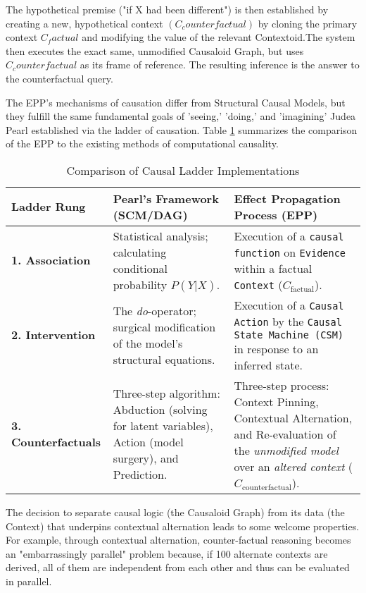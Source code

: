 The hypothetical premise ("if X had been different") is then established by creating a new, hypothetical context $(C_counterfactual)$ by cloning the primary context $C_factual$ and modifying the value of the relevant Contextoid.The system then executes the exact same, unmodified Causaloid Graph, but uses $C_counterfactual$ as its frame of reference. The resulting inference is the answer to the counterfactual query. 


The EPP's mechanisms of causation differ from Structural Causal Models, 
but they fulfill the same fundamental goals of 'seeing,' 'doing,' and 'imagining' Judea Pearl established
via the ladder of causation. Table \ref{tab:ladder_comparison} summarizes the comparison of the EPP to the existing methods of computational causality.
 

\begin{table}[h!]
\centering
\caption{Comparison of Causal Ladder Implementations}
\label{tab:ladder_comparison}
\begin{tabular}{|l|p{5.5cm}|p{5.5cm}|}
\hline
\textbf{Ladder Rung} & \textbf{Pearl's Framework (SCM/DAG)} & \textbf{Effect Propagation Process (EPP)} \\
\hline
\textbf{1. Association} &
Statistical analysis; calculating conditional probability $P(Y|X)$. &
Execution of a \texttt{causal function} on \texttt{Evidence} within a factual \texttt{Context} ($C_{\text{factual}}$). \\
\hline
\textbf{2. Intervention} &
The \textit{do}-operator; surgical modification of the model's structural equations. &
Execution of a \texttt{Causal Action} by the \texttt{Causal State Machine (CSM)} in response to an inferred state. \\
\hline
\textbf{3. Counterfactuals} &
Three-step algorithm: Abduction (solving for latent variables), Action (model surgery), and Prediction. &
Three-step process: Context Pinning, Contextual Alternation, and Re-evaluation of the \textit{unmodified model} over an \textit{altered context} ($C_{\text{counterfactual}}$). \\
\hline
\end{tabular}
\end{table}

The decision to separate causal logic (the Causaloid Graph) from its data (the Context) that underpins
contextual alternation leads to some welcome properties. For example, through contextual alternation,  counter-factual reasoning becomes an "embarrassingly parallel" problem because, if 100 alternate contexts are derived, all of them are independent from each other and thus can be evaluated in parallel. 


